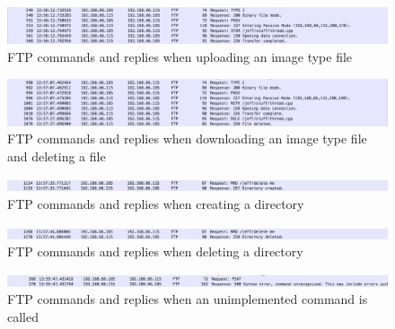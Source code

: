 \documentclass[10pt,twocolumn]{witseiepaper}
\begin{document}
\begin{appendix}
\begin{figure}[h]
	\centering
	\includegraphics[width=1\textwidth]{theirclientupload.png}
	\caption{FTP commands and replies when uploading an image type file}
	\raggedright
	\label{fig:binaryUploadclient}	
\end{figure}

\begin{figure}[h]
	\centering
	\includegraphics[width=1\textwidth]{theirclientdeleteanddownload.png}
	\caption{FTP commands and replies when downloading an image type file and deleting a file}
	\raggedright
	\label{fig:binaryDownloadclient}	
\end{figure}

\begin{figure}[h]
	\centering
	\includegraphics[width=1\textwidth]{theirclientMKD.png}
	\caption{FTP commands and replies when creating a directory}
	\raggedright
	\label{fig:makeDirectoryclient}	
\end{figure}

\begin{figure}[h]
	\centering
	\includegraphics[width=1\textwidth]{theirclientRMD.png}
	\caption{FTP commands and replies when deleting a directory}
	\raggedright
	\label{fig:deleteDirclient}	
\end{figure}

\begin{figure}[h]
	\centering
	\includegraphics[width=1\textwidth]{theirclientCommandNotKnown.png}
	\caption{FTP commands and replies when an unimplemented command is called}
	\raggedright
	\label{fig:error}	
\end{figure}

\end{appendix}
\end{document}
